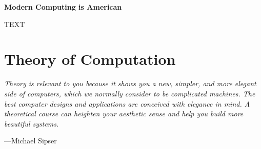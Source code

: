 \begin{tcolorbox}[breakable, enhanced, colback=textbook-blue, sharp corners]
	\vspace{2mm}
	\begin{center}
		\textbf{Modern Computing is American}
	\end{center}
	\vspace{1mm}
	TEXT
	\vspace{1mm}
\end{tcolorbox}
\vspace{7mm}


\newpage


\part*{Theory of Computation}

\vspace{4mm}
\begin{displayquote}
	\textit{Theory is relevant to you because it shows you a new, simpler, and more elegant side of computers, which we normally consider to be complicated machines. The best computer designs and applications are conceived with elegance in mind. A theoretical course can heighten your aesthetic sense and help you build more beautiful systems.}
	\begin{flushright}
		---Michael Sipser
	\end{flushright}
\end{displayquote}
\vspace{4mm}


